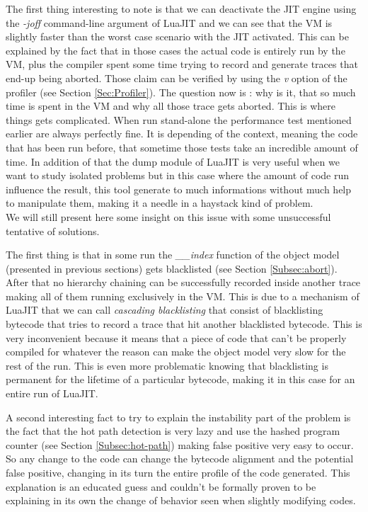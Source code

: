 
The first thing interesting to note is that we can deactivate the JIT engine using
the \emph{-joff} command-line argument of LuaJIT and we can see that the VM is
slightly faster than the worst case scenario with the JIT activated. This can
be explained by the fact that in those cases the actual code is entirely run by
the VM, plus the compiler spent some time trying to record and generate traces
that end-up being aborted. Those claim can be verified by using the \emph{v}
option of the profiler (see Section \ref{Sec:Profiler}). The question now is :
why is it, that so much time is spent in the VM and why all those trace gets
aborted. This is where things gets complicated. When run stand-alone the
performance test mentioned earlier are always perfectly fine. It is depending of
the context, meaning the code that has been run before, that sometime those
tests take an incredible amount of time. In addition of that the dump module of
LuaJIT is very useful when we want to study isolated problems but in this case
where the amount of code run influence the result, this tool generate to much
informations without much help to manipulate them, making it a needle in a
haystack kind of problem.\\

We will still present here some insight on this issue with some unsuccessful
tentative of solutions.

The first thing is that in some run the \emph{\_\_index}
function of the object model (presented in previous sections) gets blacklisted
(see Section \ref{Subsec:abort}). After that no hierarchy chaining can be
successfully recorded inside another trace making all of them running
exclusively in the VM. This is due to a mechanism of LuaJIT that we can call
\emph{cascading blacklisting} that consist of blacklisting bytecode that tries to
record a trace that hit another blacklisted bytecode. This is very inconvenient
because it means that a piece of code that can't be properly compiled for
whatever the reason can make the object model very slow for the rest of the run.
This is even more problematic knowing that blacklisting is permanent for the
lifetime of a particular bytecode, making it in this case for an entire run of
LuaJIT.

A second interesting fact to try to explain the instability part of the problem
is the fact that the hot path detection is very lazy and use the hashed program
counter (see Section \ref{Subsec:hot-path}) making false positive very easy to
occur. So any change to the code can change the bytecode alignment and the
potential false positive, changing in its turn the entire profile of the code
generated. This explanation is an educated guess and couldn't be formally proven
to be explaining in its own the change of behavior seen when slightly modifying
codes.

